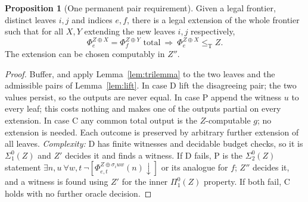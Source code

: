 \documentclass[11pt,letterpaper]{article}
\theoremstyle{definition}
\newtheorem{proposition}[definition]{Proposition}
\numberwithin{equation}{section}
\newcommand{\leT}{\le_{\mathrm T}}
\newcommand{\dn}{{\downarrow}}
\newcommand{\src}[1]{\leavevmode{\sffamily\footnotesize\color{Steel}[#1]}}
\begin{document}
\begin{proposition}[One permanent pair requirement]\label{prop:onereq}\src{R2, R6, R7}
Given a legal frontier, distinct leaves $i,j$ and indices $e,f$, there is a legal extension of the whole frontier such that for all $X,Y$ extending the new leaves $i,j$ respectively,
\[
 \Phi_e^{Z\oplus X}=\Phi_f^{Z\oplus Y}\text{ total}\ \Longrightarrow\ \Phi_e^{Z\oplus X}\leT Z .
\]
The extension can be chosen computably in $Z''$.
\end{proposition}
\begin{proof}
Buffer, and apply Lemma~\ref{lem:trilemma} to the two leaves and the admissible pairs of Lemma~\ref{lem:lift}. In case D lift the disagreeing pair; the two values persist, so the outputs are never equal. In case P append the witness $u$ to every leaf; this costs nothing and makes one of the outputs partial on every extension. In case C any common total output is the $Z$-computable $g$; no extension is needed. Each outcome is preserved by arbitrary further extension of all leaves. \emph{Complexity:} D has finite witnesses and decidable budget checks, so it is $\Sigma^0_1(Z)$ and $Z'$ decides it and finds a witness. If D fails, P is the $\Sigma^0_2(Z)$ statement $\exists n,u\ \forall w,t\ \neg[\Phi^{Z\oplus\sigma_iuw}_{e,t}(n)\dn]$ or its analogue for $f$; $Z''$ decides it, and a witness is found using $Z'$ for the inner $\Pi^0_1(Z)$ property. If both fail, C holds with no further oracle decision.
\end{proof}
\end{document}
